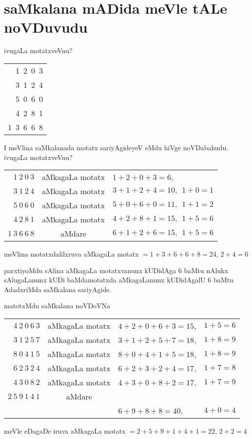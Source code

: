 \chapter{saMkalana mADida meVle tALe noVDuvudu}

ivugaLa motatxveVnu?

\begin{tabular}{r}
{\rm 1~2~0~3}\\
{\rm 3~1~2~4}\\
{\rm 5~0~6~0}\\
{\rm 4~2~8~1}\\\cline{1-1}
{\rm 1~3~6~6~8}
\end{tabular}

I meVlina saMkalanada motatx sariyAgideyeV eMdu hiVge noVDabahudu. ivugaLa motatxveVnu?

\begin{tabular}{rcl}
$1~ 2~ 0~  3$ & aMkagaLa motatx & $1+2+0+3=6$,\\
$3~1~2~4$ & aMkagaLa motatx & $3+1+2+4=10,~~ 1+0=1$\\
$5~0~6~0$ & aMkagaLa motatx & $5+0+6+0=11, ~~ 1+1=2$\\
$4~2~8~1$ & aMkagaLa motatx & $4+2+8+1=15, ~~ 1+5=6$\\\cline{1-1}
$1~3~6~6~8$ & aMdare & $6+1+2+6=15,~~ 1+5=6$ 
\end{tabular}

meVlina motatxdalilxruva aMkagaLa motatx $= 1+3+6+6+8=24$, $2+4=6$

parxtiyoMdu sAlina aMkagaLa motatxvanunx kUDidAga $6$ baMtu nAlukx sAlugaLanunx kUDi baMdamotatxda aMkagaLanunx kUDidAgalU $6$ baMtu AdadxriMda saMkalana sariyAgide.

matotxMdu saMkalana noVDoVNa

\begin{tabular}{rcll}
$4~2~0~6~3$ & aMkagaLa motatx & $4+2+0+6+3=15$, & $1+5=6$\\ 
$3~1~2~5~7$ & aMkagaLa motatx & $3+1+2+5+7=18$, & $1+8=9$\\
$8~0~4~1~5$ & aMkagaLa motatx & $8+0+4+1+5=18$, & $1+8=9$\\
$6~2~3~2~4$ & aMkagaLa motatx & $6+2+3+2+4=17$, & $1+7=8$\\
$4~3~0~8~2$ & aMkagaLa motatx & $4+3+0+8+2=17$, & $1+7=9$\\\cline{1-1}\cline{4-4}
$2~5~9~1~4~1$ & aMdare & \\
& & $6+9+8+8=40$, & $4+0=4$
\end{tabular}

meVle eDagaDe iruva aMkagaLa motatx $=2+5+9+1+4+1=22$, $2+2=4$

